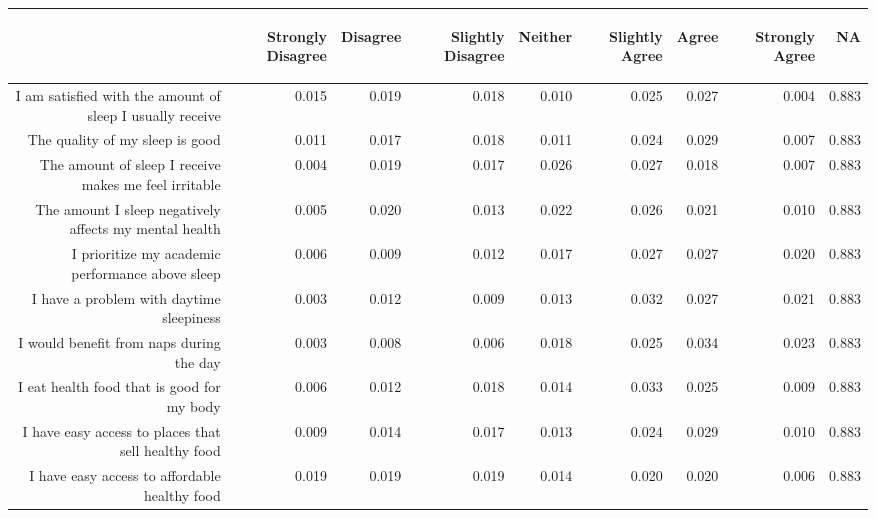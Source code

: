 \documentclass{article}\usepackage[]{graphicx}\usepackage[]{color}
\makeatletter
\newenvironment{kframe}{%
 \def\at@end@of@kframe{}%
 \ifinner\ifhmode%
  \def\at@end@of@kframe{\end{minipage}}%
  \begin{minipage}{\columnwidth}%
 \fi\fi%
 \def\FrameCommand##1{\hskip\@totalleftmargin \hskip-\fboxsep
 \colorbox{shadecolor}{##1}\hskip-\fboxsep
     \hskip-\linewidth \hskip-\@totalleftmargin \hskip\columnwidth}%
 \MakeFramed {\advance\hsize-\width
   \@totalleftmargin\z@ \linewidth\hsize
   \@setminipage}}%
 {\par\unskip\endMakeFramed%
 \at@end@of@kframe}
\makeatother
\begin{document}
\begin{table}[ht]
\centering
\begin{tabular}{rrrrrrrrr}
  \hline
 & \begin{sideways} Strongly Disagree \end{sideways} & \begin{sideways} Disagree \end{sideways} & \begin{sideways} Slightly Disagree \end{sideways} & \begin{sideways} Neither \end{sideways} & \begin{sideways} Slightly Agree \end{sideways} & \begin{sideways} Agree \end{sideways} & \begin{sideways} Strongly Agree \end{sideways} & \begin{sideways} NA \end{sideways} \\ 
  \hline
I am satisfied with the amount of sleep I usually receive & 0.015 & 0.019 & 0.018 & 0.010 & 0.025 & 0.027 & 0.004 & 0.883 \\ 
  The quality of my sleep is good & 0.011 & 0.017 & 0.018 & 0.011 & 0.024 & 0.029 & 0.007 & 0.883 \\ 
  The amount of sleep I receive makes me feel irritable & 0.004 & 0.019 & 0.017 & 0.026 & 0.027 & 0.018 & 0.007 & 0.883 \\ 
  The amount I sleep negatively affects my mental health & 0.005 & 0.020 & 0.013 & 0.022 & 0.026 & 0.021 & 0.010 & 0.883 \\ 
  I prioritize my academic performance above sleep & 0.006 & 0.009 & 0.012 & 0.017 & 0.027 & 0.027 & 0.020 & 0.883 \\ 
  I have a problem with daytime sleepiness & 0.003 & 0.012 & 0.009 & 0.013 & 0.032 & 0.027 & 0.021 & 0.883 \\ 
  I would benefit from naps during the day & 0.003 & 0.008 & 0.006 & 0.018 & 0.025 & 0.034 & 0.023 & 0.883 \\ 
  I eat health food that is good for my body & 0.006 & 0.012 & 0.018 & 0.014 & 0.033 & 0.025 & 0.009 & 0.883 \\ 
  I have easy access to places that sell healthy food & 0.009 & 0.014 & 0.017 & 0.013 & 0.024 & 0.029 & 0.010 & 0.883 \\ 
  I have easy access to affordable healthy food & 0.019 & 0.019 & 0.019 & 0.014 & 0.020 & 0.020 & 0.006 & 0.883 \\ 
   \hline
\end{tabular}
\end{table}
\begin{kframe}

{\ttfamily\noindent\bfseries{}}\end{kframe}
\end{document}

